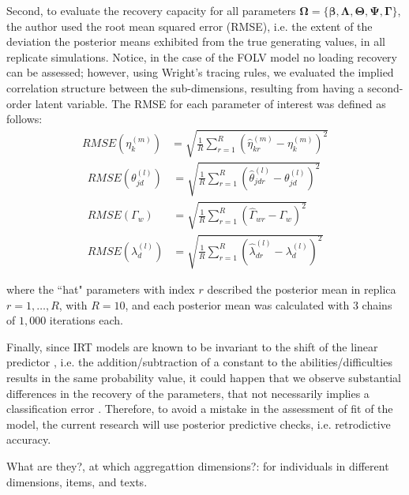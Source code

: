 Second, to evaluate the recovery capacity for all parameters $\pmb{\Omega} = \{ \pmb{\beta}, \pmb{\Lambda}, \pmb{\Theta}, \pmb{\Psi}, \pmb{\Gamma} \}$, the author used the root mean squared error (RMSE), i.e. the extent of the deviation the posterior means exhibited from the true generating values, in all replicate simulations. Notice, in the case of the FOLV model no loading recovery can be assessed; however, using Wright's tracing rules, we evaluated the implied correlation structure between the sub-dimensions, resulting from having a second-order latent variable. The RMSE for each parameter of interest was defined as follows:
%
\begin{align}
	RMSE \left( \eta^{(m)}_{k} \right) &=\sqrt{\frac{1}{R} \sum_{r=1}^{R} \left( \hat{\eta}^{(m)}_{kr} - \eta^{(m)}_{k} \right)^2}
\end{align}
%
\begin{align}
	RMSE \left( \theta^{(l)}_{jd} \right) &=\sqrt{\frac{1}{R} \sum_{r=1}^{R} \left( \hat{\theta}^{(l)}_{jdr} - \theta^{(l)}_{jd} \right)^2} \\
	RMSE \left( \Gamma_{w} \right) &=\sqrt{\frac{1}{R} \sum_{r=1}^{R} \left( \hat{\Gamma}_{wr} - \Gamma_{w} \right)^2} \\
	RMSE \left( \lambda^{(l)}_{d} \right) &=\sqrt{\frac{1}{R} \sum_{r=1}^{R} \left( \hat{\lambda}^{(l)}_{dr} - \lambda^{(l)}_{d} \right)^2}
\end{align}

\noindent where the ``hat" parameters with index $r$ described the posterior mean in replica $r=1, \dots, R$, with $R=10$, and each posterior mean was calculated with $3$ chains of $1,000$ iterations each.

Finally, since IRT models are known to be invariant to the shift of the linear predictor \cite{Baker_et_al_1992, Bock_1972}, i.e. the addition/subtraction of a constant to the abilities/difficulties results in the same probability value, it could happen that we observe substantial differences in the recovery of the parameters, that not necessarily implies a classification error  \cite{Wollack_2002}. Therefore, to avoid a mistake in the assessment of fit of the model, the current research will use posterior predictive checks, i.e. retrodictive accuracy. 

{ \color{red} What are they?, at which aggregattion dimensions?: for individuals in different dimensions, items, and texts. }




